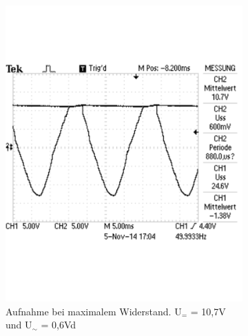 \documentclass[12pt,a4paper]{article}
\begin{document}
\begin{figure}[H]
        \centering
        \begin{subfigure}[b]{0.48\textwidth}
                \includegraphics[width=\textwidth , scale = 0.4]{2_4_1000F_1.pdf}
                \caption[Aufnahme bei maximalem Widerstand. U$_{=}$ = 10,7V und U$_\sim$ = 0,6V]{Aufnahme bei maximalem Widerstand. U$_{=}$ = 10,7V und U$_\sim$ = 0,6Vd}
 				 \label{fig:2_4_1000F_1}
        \end{subfigure}%
        \hfill
        \begin{subfigure}[b]{0.48\textwidth}

\end{subfigure}
\end{figure}
\end{document}

